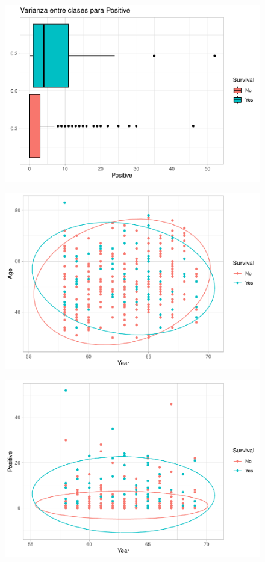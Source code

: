 \begin{figure}[H]\center\includegraphics[width=.8\linewidth]{img/Clasificacion_files/figure-latex/unnamed-chunk-17-3}\caption{}\end{figure}

\begin{figure}[H]\center\includegraphics[width=.8\linewidth]{img/Clasificacion_files/figure-latex/unnamed-chunk-18-1}\caption{}\end{figure}

\begin{figure}[H]\center\includegraphics[width=.8\linewidth]{img/Clasificacion_files/figure-latex/unnamed-chunk-18-2}\caption{}\end{figure}

